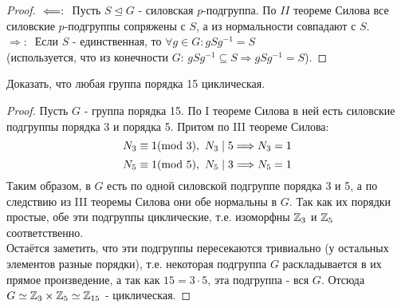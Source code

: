 \begin{proof}
    $\\\Longleftarrow: \ $ Пусть $S \unlhd G$ - силовская $p$-подгруппа. По $II$ теореме Силова все силовские $p$-подгруппы сопряжены с $S$, а из нормальности совпадают с $S$.\\
    $\Longrightarrow: \ $ Если $S$ - единственная, то $\forall g \in G: gSg^{-1} = S$\\
    (используется, что из конечности $G$: $gSg^{-1} \subseteq S \Rightarrow gSg^{-1} = S$). 
\end{proof}
\begin{exercise}
    Доказать, что любая группа порядка 15 циклическая.
\end{exercise}
\begin{proof}
    Пусть $G$ - группа порядка 15. По I теореме Силова в ней есть силовские подгруппы порядка 3 и порядка 5. Притом по III теореме Силова: 
    \[N_3 \equiv 1(\textup{mod } 3), \ N_3 \mid 5 \Longrightarrow N_3 = 1\]
    \[N_5 \equiv 1(\textup{mod } 5), \ N_5 \mid 3 \Longrightarrow N_5 = 1\]
    Таким образом, в $G$ есть по одной силовской подгруппе порядка 3 и 5, а по следствию из III теоремы Силова они обе нормальны в $G$. Так как их порядки простые, обе эти подгруппы циклические, т.е. изоморфны $\mathbb{Z}_3$ и $\mathbb{Z}_5$ соответственно.\\
    Остаётся заметить, что эти подгруппы пересекаются тривиально (у остальных элементов разные порядки), т.е. некоторая подгруппа $G$ раскладывается в их прямое произведение, а так как $15 = 3 \cdot 5$, эта подгруппа - вся $G$. Отсюда $G \simeq \mathbb{Z}_3 \times \mathbb{Z}_5 \simeq \mathbb{Z}_{15}$ - циклическая.
\end{proof}
\setcounter{thcount}{0}
\setcounter{concount}{0}
\setcounter{subthcount}{0}
\setcounter{lemcount}{0}
\newpage